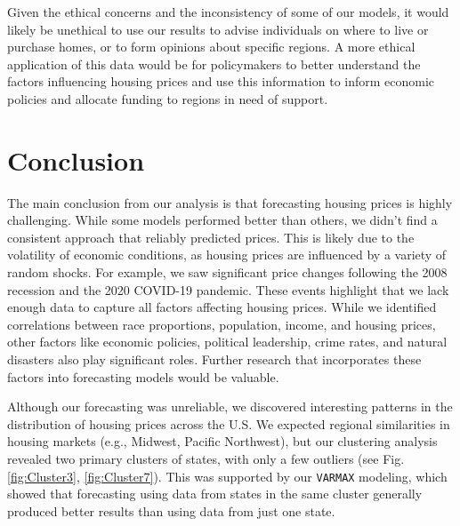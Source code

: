 \documentclass[11pt]{amsart}
\begin{document}
Given the ethical concerns and the inconsistency of some of our models, it would likely be unethical to use our results to advise individuals on where to live or purchase homes, or to form opinions about specific regions. A more ethical application of this data would be for policymakers to better understand the factors influencing housing prices and use this information to inform economic policies and allocate funding to regions in need of support.


\section{Conclusion} 
The main conclusion from our analysis is that forecasting housing prices is highly challenging. While some models performed better than others, we didn’t find a consistent approach that reliably predicted prices. This is likely due to the volatility of economic conditions, as housing prices are influenced by a variety of random shocks. For example, we saw significant price changes following the 2008 recession and the 2020 COVID-19 pandemic. These events highlight that we lack enough data to capture all factors affecting housing prices. While we identified correlations between race proportions, population, income, and housing prices, other factors like economic policies, political leadership, crime rates, and natural disasters also play significant roles. Further research that incorporates these factors into forecasting models would be valuable.

Although our forecasting was unreliable, we discovered interesting patterns in the distribution of housing prices across the U.S. We expected regional similarities in housing markets (e.g., Midwest, Pacific Northwest), but our clustering analysis revealed two primary clusters of states, with only a few outliers (see Fig. \ref{fig:Cluster3}, \ref{fig:Cluster7}). This was supported by our \texttt{VARMAX} modeling, which showed that forecasting using data from states in the same cluster generally produced better results than using data from just one state.
\end{document}
